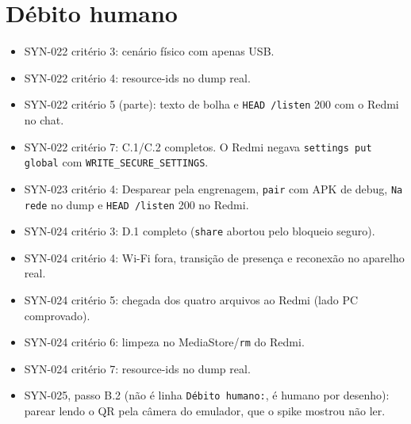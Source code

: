 \documentclass[11pt,a4paper]{article}
\begin{document}
\section{Débito humano}
\begin{itemize}
  \item SYN-022 critério 3: cenário físico com apenas USB.
  \item SYN-022 critério 4: resource-ids no dump real.
  \item SYN-022 critério 5 (parte): texto de bolha e \texttt{HEAD /listen} 200
        com o Redmi no chat.
  \item SYN-022 critério 7: C.1/C.2 completos. O Redmi negava
        \texttt{settings put global} com \texttt{WRITE\_SECURE\_SETTINGS}.
  \item SYN-023 critério 4: Desparear pela engrenagem, \texttt{pair} com APK
        de debug, \texttt{Na rede} no dump e \texttt{HEAD /listen} 200 no
        Redmi.
  \item SYN-024 critério 3: D.1 completo (\texttt{share} abortou pelo
        bloqueio seguro).
  \item SYN-024 critério 4: Wi-Fi fora, transição de presença e reconexão no
        aparelho real.
  \item SYN-024 critério 5: chegada dos quatro arquivos ao Redmi (lado PC
        comprovado).
  \item SYN-024 critério 6: limpeza no MediaStore/\texttt{rm} do Redmi.
  \item SYN-024 critério 7: resource-ids no dump real.
  \item SYN-025, passo B.2 (não é linha \texttt{Débito humano:}, é humano por
        desenho): parear lendo o QR pela câmera do emulador, que o spike
        mostrou não ler.
\end{itemize}
\end{document}
